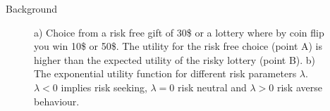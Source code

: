 \begin{exampleblock}{Background}
\begin{figure}[htp]
\quad
{}

\caption{a) Choice from a risk free gift of 30\$ or a lottery where by coin flip you win 10\$ or 50\$. The utility for the risk free choice (point A) is higher than the expected utility of the risky lottery (point B). b) The exponential utility function for different risk parameters $\lambda$. $\lambda < 0$ implies risk seeking, $\lambda = 0 $ risk neutral and $\lambda > 0 $ risk averse behaviour.}


\end{figure}
\end{exampleblock}
